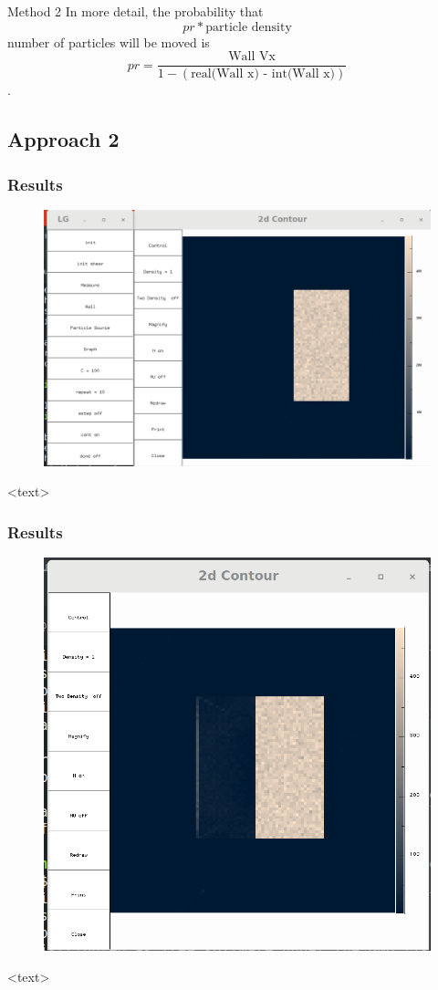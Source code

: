 \documentclass{beamer}
\begin{document}
\begin{frame}{Method 2}
In more detail, the probability that $$ pr * \textrm{particle density}$$ number of particles will be moved is $$pr = \frac{\textrm{Wall Vx}}{1-(\textrm{real(Wall x) - int(Wall x)})}$$.
\end{frame}



\subsection{Approach 2}
\begin{frame}
\frametitle{Results}
\begin{figure}
\includegraphics[scale=0.2]{A11p2}
\caption{}
\end{figure}
<text>
\end{frame}

\begin{frame}
\frametitle{Results}
\begin{figure}
\includegraphics[scale=0.2]{A11p5}
\caption{}
\end{figure}
<text>
\end{frame}
\end{document}
